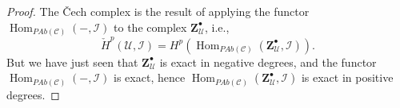 \documentclass[10pt,a4paper]{amsart}
\theoremstyle{plain}
\theoremstyle{definition}
\theoremstyle{remark}
\numberwithin{equation}{subsection}
\def\Hom{\mathop{\mathrm{Hom}}\nolimits}
\begin{document}
\begin{proof}
The {\v C}ech complex is the result of applying the functor
$\Hom_{\textit{PAb}(\mathcal{C})}(-, \mathcal{I}) $ to the complex $
\mathbf{Z}^\bullet_\mathcal{U} $, i.e.,
$$
\check H^p(\mathcal{U}, \mathcal{I}) = H^p
(\Hom_{\textit{PAb}(\mathcal{C})} (\mathbf{Z}^\bullet_\mathcal{U},
\mathcal{I})).
$$
But we have just seen that $\mathbf{Z}^\bullet_\mathcal{U}$ is exact in
negative degrees, and the functor $\Hom_{\textit{PAb}(\mathcal{C})}(-,
\mathcal{I})$ is exact, hence $\Hom_{\textit{PAb}(\mathcal{C})}
(\mathbf{Z}^\bullet_\mathcal{U}, \mathcal{I})$ is exact in positive degrees.
\end{proof}
\end{document}
